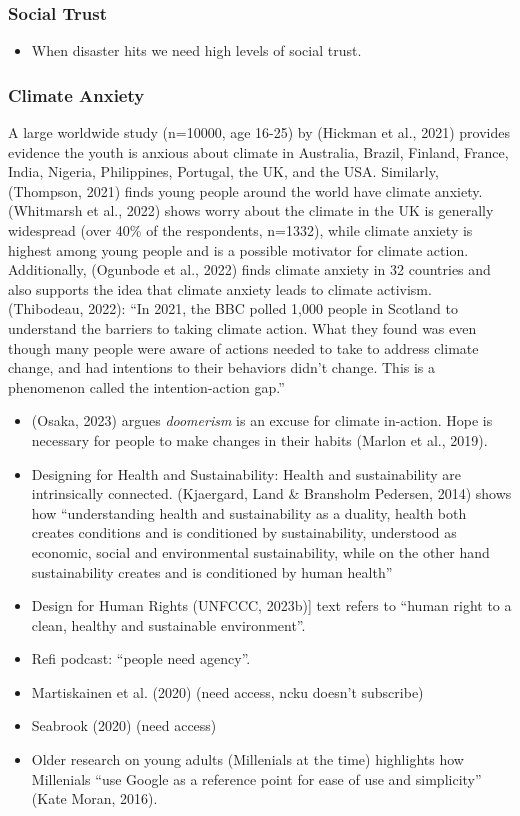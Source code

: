 \documentclass[
  letterpaper,
  DIV=11,
  numbers=noendperiod]{scrartcl}
\providecommand{\tightlist}{%
  \setlength{\itemsep}{0pt}\setlength{\parskip}{0pt}}\usepackage{longtable,booktabs,array}
\begin{document}
\subsubsection{Social Trust}\label{social-trust}

\begin{itemize}
\tightlist
\item
  When disaster hits we need high levels of social trust.
\end{itemize}

\subsubsection{Climate Anxiety}\label{climate-anxiety}

A large worldwide study (n=10000, age 16-25) by (Hickman et al., 2021)
provides evidence the youth is anxious about climate in Australia,
Brazil, Finland, France, India, Nigeria, Philippines, Portugal, the UK,
and the USA. Similarly, (Thompson, 2021) finds young people around the
world have climate anxiety. (Whitmarsh et al., 2022) shows worry about
the climate in the UK is generally widespread (over 40\% of the
respondents, n=1332), while climate anxiety is highest among young
people and is a possible motivator for climate action. Additionally,
(Ogunbode et al., 2022) finds climate anxiety in 32 countries and also
supports the idea that climate anxiety leads to climate activism.
(Thibodeau, 2022): ``In 2021, the BBC polled 1,000 people in Scotland to
understand the barriers to taking climate action. What they found was
even though many people were aware of actions needed to take to address
climate change, and had intentions to their behaviors didn't change.
This is a phenomenon called the intention-action gap.''

\begin{itemize}
\item
  (Osaka, 2023) argues \emph{doomerism} is an excuse for climate
  in-action. Hope is necessary for people to make changes in their
  habits (Marlon et al., 2019).
\item
  Designing for Health and Sustainability: Health and sustainability are
  intrinsically connected. (Kjaergard, Land \& Bransholm Pedersen, 2014)
  shows how ``understanding health and sustainability as a duality,
  health both creates conditions and is conditioned by sustainability,
  understood as economic, social and environmental sustainability, while
  on the other hand sustainability creates and is conditioned by human
  health''
\item
  Design for Human Rights (UNFCCC, 2023b){]} text refers to ``human
  right to a clean, healthy and sustainable environment''.
\item
  Refi podcast: ``people need agency''.
\item
  Martiskainen et al. (2020) (need access, ncku doesn't subscribe)
\item
  Seabrook (2020) (need access)
\item
  Older research on young adults (Millenials at the time) highlights how
  Millenials ``use Google as a reference point for ease of use and
  simplicity'' (Kate Moran, 2016).
\end{itemize}
\end{document}
